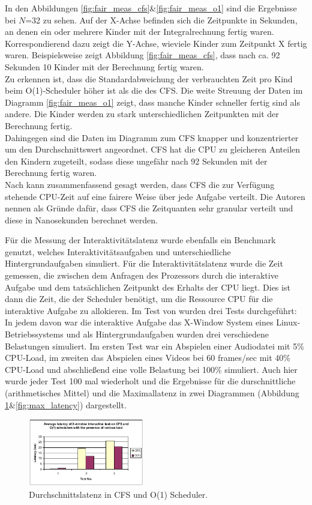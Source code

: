 In den Abbildungen \ref{fig:fair_meas_cfs}\&\ref{fig:fair_meas_o1} sind die Ergebnisse bei $N$=32 zu sehen. Auf der X-Achse befinden sich die Zeitpunkte in Sekunden, an denen ein oder mehrere Kinder mit der Integralrechnung fertig waren. Korrespondierend dazu zeigt die Y-Achse, wieviele Kinder zum Zeitpunkt X fertig waren. Beispielsweise zeigt Abbildung \ref{fig:fair_meas_cfs}, dass nach ca. 92 Sekunden 10 Kinder mit der Berechnung fertig waren. \\
Zu erkennen ist, dass die Standardabweichung der verbrauchten Zeit pro Kind beim O(1)-Scheduler höher ist als die des CFS. Die weite Streuung der Daten im Diagramm \ref{fig:fair_meas_o1} zeigt, dass manche Kinder schneller fertig sind als andere. Die Kinder werden zu stark unterschiedlichen Zeitpunkten mit der Berechnung fertig.\\
Dahingegen sind die Daten im Diagramm zum CFS knapper und konzentrierter um den Durchschnittswert angeordnet. CFS hat die CPU zu gleicheren Anteilen den Kindern zugeteilt, sodass diese ungefähr nach 92 Sekunden mit der Berechnung fertig waren. \\
Nach \cite{papercomparison} kann zusammenfassend gesagt werden, dass CFS die zur Verfügung stehende CPU-Zeit auf eine fairere Weise über jede Aufgabe verteilt. Die Autoren nennen als Grün\-de dafür, dass CFS die Zeitquanten sehr granular verteilt und diese in Nanosekunden berechnet werden.

Für die Messung der Interaktivitätslatenz wurde ebenfalls ein Benchmark genutzt, welches Interaktivitätsaufgaben und unterschiedliche Hintergrundaufgaben simuliert. Für die Interaktivitätslatenz wurde die Zeit gemessen, die zwischen dem Anfragen des Prozessors durch die interaktive Aufgabe und dem tatsächlichen Zeitpunkt des Erhalts der CPU liegt. Dies ist dann die Zeit, die der Scheduler benötigt, um die Ressource CPU für die interaktive Aufgabe zu allokieren. Im Test von \cite{papercomparison} wurden drei Tests durchgeführt: In jedem davon war die interaktive Aufgabe das X-Window System eines Linux-Betriebssystems und als Hintergrundaufgaben wurden drei verschiedene Belastungen simuliert. Im ersten Test war ein Abspielen einer Audiodatei mit 5\% CPU-Load, im zweiten das Abspielen eines Videos bei 60 frames/sec mit 40\% CPU-Load und abschließend eine volle Belastung bei 100\% simuliert. Auch hier wurde jeder Test 100 mal wiederholt und die Ergebnisse für die durschnittliche (arithmetisches Mittel) und die Maximallatenz in zwei Diagrammen (Abbildung \ref{fig:avg_latency}\&\ref{fig:max_latency}) dargestellt. 
\begin{figure} [h]
 	\centering
 	\includegraphics[width=0.45\textwidth]{pictures/avg_latency.png}
 	\caption{Durchschnittslatenz in CFS und O(1) Scheduler.}
 	\label{fig:avg_latency}
\end{figure}

